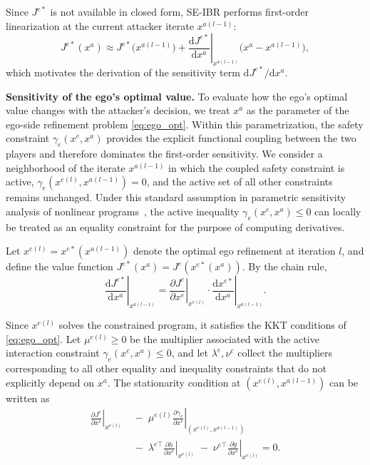 \documentclass[10pt,twocolumn,letterpaper]{article}
\theoremstyle{plain}
\theoremstyle{remark}
\renewcommand{\paragraph}[1]{\vspace{.5em}\noindent\textbf{#1.}}
\begin{document}
Since \(J^{e*}\) is not available in closed form, SE-IBR performs
first-order linearization at the current attacker iterate
\(x^{a(l-1)}\):
\begin{equation}
J^{e*}(x^a)
\approx
J^{e*}\!\bigl(x^{a(l-1)}\bigr)
+
\left.
\frac{\mathrm{d} J^{e*}}{\mathrm{d} x^a}
\right|_{x^{a(l-1)}}
\!\bigl(x^a - x^{a(l-1)}\bigr),
\label{eq:app_linearize}
\end{equation}
which motivates the derivation of the sensitivity term
\(\mathrm{d}J^{e*}/\mathrm{d}x^a\).


\paragraph{Sensitivity of the ego’s optimal value}
To evaluate how the ego’s optimal value changes with the
attacker’s decision, we treat \(x^a\) as the parameter of the
ego-side refinement problem \eqref{eq:ego_opt}.  
Within this parametrization, the safety constraint
\(\gamma_e(x^e,x^a)\) provides the explicit functional coupling
between the two players and therefore dominates the first-order
sensitivity.  We consider a neighborhood of the iterate
\(x^{a(l-1)}\) in which the coupled safety constraint is active,
\(\gamma_e(x^{e(l)},x^{a(l-1)}) = 0\), and the active set of all
other constraints remains unchanged.  Under this standard
assumption in parametric sensitivity analysis of nonlinear
programs~\cite{spica2020real}, the active inequality
\(\gamma_e(x^e,x^a)\le 0\) can locally be treated as an equality
constraint for the purpose of computing derivatives.

Let \(x^{e(l)} = x^{e*}(x^{a(l-1)})\) denote the optimal ego
refinement at iteration \(l\), and define the value function
\(J^{e*}(x^a) = J^e(x^{e*}(x^a))\).  
By the chain rule,
\begin{equation}
\left.
\frac{\mathrm{d}J^{e*}}{\mathrm{d}x^a}
\right|_{x^{a(l-1)}}
=
\left.
\frac{\partial J^e}{\partial x^e}
\right|_{x^{e(l)}}
\cdot
\left.
\frac{\mathrm{d}x^{e*}}{\mathrm{d}x^a}
\right|_{x^{a(l-1)}}.
\label{eq:app_chainrule}
\end{equation}

Since \(x^{e(l)}\) solves the constrained program, it satisfies
the KKT conditions of \eqref{eq:ego_opt}.  
Let \(\mu^{e(l)}\ge 0\) be the multiplier associated with the
active interaction constraint \(\gamma_e(x^e,x^a)\le 0\), and let
\(\lambda^e,\nu^e\) collect the multipliers corresponding to all
other equality and inequality constraints that do not explicitly
depend on \(x^a\).  The stationarity condition at
\((x^{e(l)},x^{a(l-1)})\) can be written as
\begin{equation}
\begin{aligned}
\left.\frac{\partial J^e}{\partial x^e}\right|_{x^{e(l)}}
&\;-\;
\mu^{e(l)}
  \left.\frac{\partial \gamma_e}{\partial x^e}
  \right|_{(x^{e(l)},x^{a(l-1)})} \\
&\;-\;
\lambda^{e\top}
  \left.\frac{\partial h}{\partial x^e}\right|_{x^{e(l)}}
\;-\;
\nu^{e\top}
  \left.\frac{\partial g}{\partial x^e}\right|_{x^{e(l)}}
= 0.
\end{aligned}
\label{eq:app_kkt_stationarity}
\end{equation}
\end{document}
